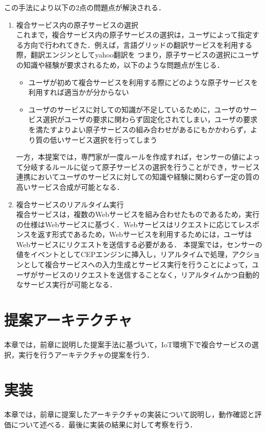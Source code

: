 \documentclass{kuisthesis}			%
\begin{document}
この手法により以下の2点の問題点が解決される．
\begin{enumerate}
\item 複合サービス内の原子サービスの選択\\
これまで，複合サービス内の原子サービスの選択は，ユーザによって指定する方向で行われてきた．例えば，言語グリッドの翻訳サービスを利用する際，翻訳エンジンとしてyahoo翻訳を
つまり，原子サービスの選択にユーザの知識や経験が要求されるため，以下のような問題点が生じる．
\begin{itemize}
\item ユーザが初めて複合サービスを利用する際にどのような原子サービスを利用すれば適当かが分からない
\item ユーザのサービスに対しての知識が不足しているために，ユーザのサービス選択がユーザの要求に関わらず固定化されてしまい，ユーザの要求を満たすよりよい原子サービスの組み合わせがあるにもかかわらず，より質の低いサービス選択を行ってしまう
\end{itemize}
一方，本提案では，専門家が一度ルールを作成すれば，センサーの値によって分岐するルールに従って原子サービスの選択を行うことができ，サービス連携においてユーザのサービスに対しての知識や経験に関わらず一定の質の高いサービス合成が可能となる．

\item 複合サービスのリアルタイム実行\\
複合サービスは，複数のWebサービスを組み合わせたものであるため，実行の仕様はWebサービスに基づく．Webサービスはリクエストに応じてレスポンスを返す形式であるため，Webサービスを利用するためには，ユーザはWebサービスにリクエストを送信する必要がある．
本提案では，センサーの値をイベントとしてCEPエンジンに挿入し，リアルタイムで処理，アクションとして複合サービスへの入力生成とサービス実行を行うことによって，ユーザがサービスのリクエストを送信することなく，リアルタイムかつ自動的なサービス実行が可能となる．
\end{enumerate}

\section{提案アーキテクチャ}
本章では，前章に説明した提案手法に基づいて，IoT環境下で複合サービスの選択，実行を行うアーキテクチャの提案を行う．

\subsection{}

\section{実装}
本章では，前章に提案したアーキテクチャの実装について説明し，動作確認と評価について述べる．最後に実装の結果に対して考察を行う．
\end{document}
